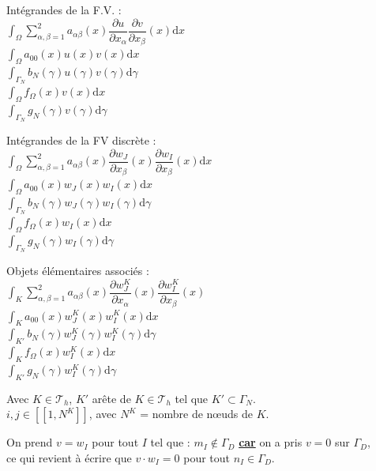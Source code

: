 \documentclass[12pt,a4paper]{article}
\begin{document}
\begin{sol}
\begin{enumerate}
\begin{minipage}[t]{18.5cm}
				\begin{minipage}[t]{5.5cm}
				Intégrandes de la F.V. :\\
				$\displaystyle\int_\Omega \sum_{\alpha,\beta=1}^2 a_{\alpha\beta}(x) \dfrac{\partial u}{\partial x_\alpha}\dfrac{\partial v}{\partial x_\beta}(x)\mathrm dx$ \\
				$\displaystyle \int_\Omega a_{00}(x) u(x)v(x) \mathrm dx $\\
				$\displaystyle\int_{\Gamma_N} b_N(\gamma)u(\gamma)v(\gamma)\mathrm d\gamma$\\
				$\displaystyle\int_\Omega f_\Omega(x) v(x) \mathrm dx$ \\
				$\displaystyle\int_{\Gamma_N} g_N(\gamma)v(\gamma)\mathrm d\gamma$
			\end{minipage}\begin{minipage}[t]{6cm}
			Intégrandes de la FV discrète :\\
			$\displaystyle\int_\Omega\sum_{\alpha,\beta=1}^2 a_{\alpha\beta}(x)\dfrac{\partial w_J}{\partial x_\beta}(x)\dfrac{\partial w_I}{\partial x_\beta}(x) \mathrm dx$\\
			$\displaystyle\int_\Omega a_{00}(x) w_J(x)w_I(x) \mathrm dx$\\
			$\displaystyle\int_{\Gamma_N}b_N(\gamma)w_J(\gamma)w_I(\gamma)\mathrm d\gamma$\\
			$\displaystyle\int_\Omega f_\Omega(x) w_I(x) \mathrm dx$\\
			$\displaystyle \int_{\Gamma_N} g_N(\gamma)w_I(\gamma)\mathrm d\gamma$
			\end{minipage}\begin{minipage}[t]{6cm}
			Objets élémentaires associés :\\
			$\displaystyle\int_K\sum_{\alpha,\beta=1}^2 a_{\alpha\beta}(x) \dfrac{\partial w_J^K}{\partial x_\alpha}(x)\dfrac{\partial w_I^K}{\partial x_\beta}(x)$\\
			$\displaystyle\int_K a_{00}(x)w_J^K(x) w_I^K(x) \mathrm dx$\\
			$\displaystyle\int_{K'} b_N(\gamma) w_J^K(\gamma)w_I^K(\gamma)\mathrm d\gamma$\\
			$\displaystyle\int_K f_\Omega(x) w_I^K(x)\mathrm dx$\\
			$\displaystyle\int_{K'} g_N(\gamma)w_I^K(\gamma)\mathrm d\gamma$
			\end{minipage}
			\end{minipage}			
		\end{enumerate}
		
		Avec $K \in \mathcal{T}_h$, $K'$ arête de $K \in \mathcal{T}_h$ tel que $K' \subset \Gamma_N$.\\
		$i,j \in [\![1,N^K]\!]$, avec $N^K$ = nombre de nœuds de $K$.
	\end{sol}
	\begin{rmq}
		\begin{minipage}[t]{15cm}
			On prend $v=w_I$ pour tout $I$ tel que : $m_I\not\in \Gamma_D$ \textbf{\underline{car}} on a pris $v = 0$ sur $\Gamma_D$,\\
			ce qui revient à écrire que $v\cdot w_I = 0$ pour tout $n_I \in \Gamma_D$.
		\end{minipage}
	\end{rmq}
	
\end{document}
